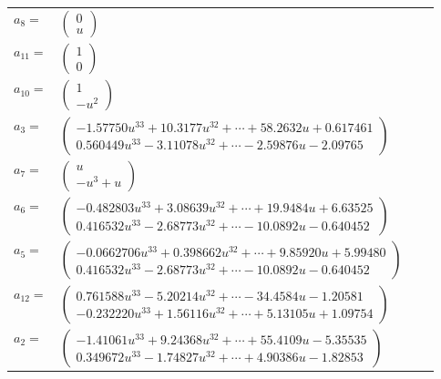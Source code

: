 \documentclass[1p]{elsarticle_modified}
\theoremstyle{definition}
\begin{document}
\begin{tabular}{m{7pt} m{180pt} m{7pt} m{180pt} }
\flushright $a_{8}=$&$\begin{pmatrix}0\\u\end{pmatrix}$ \\
\flushright $a_{11}=$&$\begin{pmatrix}1\\0\end{pmatrix}$ \\
\flushright $a_{10}=$&$\begin{pmatrix}1\\- u^2\end{pmatrix}$ \\
\flushright $a_{3}=$&$\begin{pmatrix}-1.57750 u^{33}+10.3177 u^{32}+\cdots+58.2632 u+0.617461\\0.560449 u^{33}-3.11078 u^{32}+\cdots-2.59876 u-2.09765\end{pmatrix}$ \\
\flushright $a_{7}=$&$\begin{pmatrix}u\\- u^3+u\end{pmatrix}$ \\
\flushright $a_{6}=$&$\begin{pmatrix}-0.482803 u^{33}+3.08639 u^{32}+\cdots+19.9484 u+6.63525\\0.416532 u^{33}-2.68773 u^{32}+\cdots-10.0892 u-0.640452\end{pmatrix}$ \\
\flushright $a_{5}=$&$\begin{pmatrix}-0.0662706 u^{33}+0.398662 u^{32}+\cdots+9.85920 u+5.99480\\0.416532 u^{33}-2.68773 u^{32}+\cdots-10.0892 u-0.640452\end{pmatrix}$ \\
\flushright $a_{12}=$&$\begin{pmatrix}0.761588 u^{33}-5.20214 u^{32}+\cdots-34.4584 u-1.20581\\-0.232220 u^{33}+1.56116 u^{32}+\cdots+5.13105 u+1.09754\end{pmatrix}$ \\
\flushright $a_{2}=$&$\begin{pmatrix}-1.41061 u^{33}+9.24368 u^{32}+\cdots+55.4109 u-5.35535\\0.349672 u^{33}-1.74827 u^{32}+\cdots+4.90386 u-1.82853\end{pmatrix}$ \\

\end{tabular}
\end{document}
